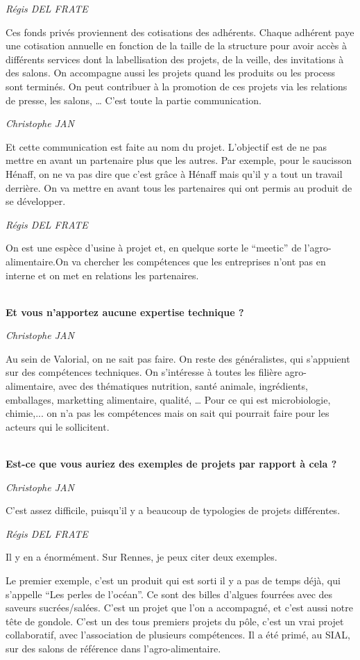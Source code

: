 \documentclass[a4paper,12pt]{report}
\begin{document}
	\emph{Régis DEL FRATE}

    Ces fonds privés proviennent des cotisations des adhérents. Chaque adhérent paye une cotisation annuelle en fonction de la taille de la structure pour avoir accès à différents services dont la labellisation des projets, de la veille, des invitations à des salons. On accompagne aussi les projets quand les produits ou les process sont terminés. On peut contribuer à la promotion de ces projets via les relations de presse, les salons, … C’est toute la partie communication.

	\emph{Christophe JAN}
	
    Et cette communication est faite au nom du projet. L’objectif est de ne pas mettre en avant un partenaire plus que les autres. Par exemple, pour le saucisson Hénaff, on ne va pas dire que c’est grâce à Hénaff mais qu’il y a tout un travail derrière. On va mettre en avant tous les partenaires qui ont permis au produit de se développer.

	\emph{Régis DEL FRATE}

    On est une espèce d’usine à projet et, en quelque sorte le “meetic” de l’agro-alimentaire.On va chercher les compétences que les entreprises n’ont pas en interne et on met en relations les partenaires.

	\textbf{\\Et vous n’apportez aucune expertise technique ?}

	\emph{Christophe JAN}
	
    Au sein de Valorial, on ne sait pas faire. On reste des généralistes, qui s’appuient sur des compétences techniques. On s’intéresse à toutes les filière agro-alimentaire, avec des thématiques nutrition, santé animale, ingrédients, emballages, marketting alimentaire, qualité, … Pour ce qui est microbiologie, chimie,... on n’a pas les compétences mais on sait qui pourrait faire pour les acteurs qui le sollicitent.

	\textbf{\\Est-ce que vous auriez des exemples de projets par rapport à cela ?}

	\emph{Christophe JAN}

    C’est assez difficile, puisqu’il y a beaucoup de typologies de projets différentes.

	\emph{Régis DEL FRATE}
	
    Il y en a énormément. Sur Rennes, je peux citer deux exemples.
    
    Le premier exemple, c’est un produit qui est sorti il y a pas de temps déjà, qui s’appelle “Les perles de l’océan”. Ce sont des billes d’algues fourrées avec des saveurs sucrées/salées. C’est un projet que l’on a accompagné, et c’est aussi notre tête de gondole. C’est un des tous premiers projets du pôle, c’est un vrai projet collaboratif, avec l’association de plusieurs compétences. Il a été primé, au SIAL, sur des salons de référence dans l’agro-alimentaire.
\end{document}
